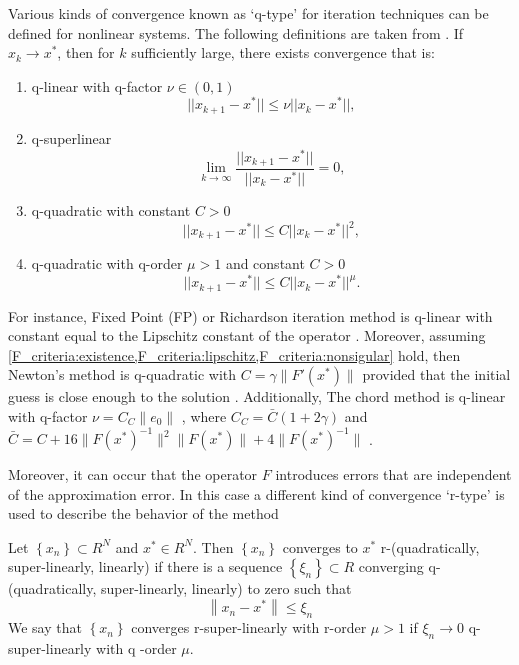 Various kinds of convergence known as `q-type' for iteration techniques can be defined for nonlinear systems. The following definitions are taken from \cite[Section 4.3]{nonlinear_cg_Kelley_1995}. If $x_k \rightarrow x^{*}$, then for $k$ sufficiently large, there exists convergence that is:
\begin{enumerate}[label=\roman*,ref=nonlinear \roman*]
  \item\label{conv_type:qlinear} q-linear with q-factor $\nu \in(0,1)$
  \[
    ||x_{k+1} - x^*|| \leq \nu ||x_k - x^*||,
  \]
  \item\label{conv_type:qsuper_linear} q-superlinear
  \[
    \lim_{k\rightarrow\infty} \frac{||x_{k+1} - x^*||}{||x_k - x^*||} = 0,
  \]
  \item\label{conv_type:qquadratic} q-quadratic with constant $C>0$
  \[
    ||x_{k+1} - x^*|| \leq C ||x_k - x^*||^2,
  \]
  \item\label{conv_type:qsuper_linear_order} q-quadratic with q-order $\mu > 1$ and constant $C>0$
  \[
    ||x_{k+1} - x^*|| \leq C ||x_k - x^*||^{\mu}.
  \]
\end{enumerate}
For instance, Fixed Point (FP) or Richardson iteration method is q-linear with constant equal to the Lipschitz constant of the operator \cite[Theorem 4.2.1]{nonlinear_cg_Kelley_1995}. Moreover, assuming \cref{F_criteria:existence,F_criteria:lipschitz,F_criteria:nonsigular} hold, then Newton's method is q-quadratic with $C = \gamma \|F'(x^*)\|$ provided that the initial guess is close enough to the solution \cite[Theorem 5.1.2]{nonlinear_cg_Kelley_1995}. Additionally, The chord method is q-linear with q-factor $\nu = C_C\|e_0\|$ \cite[Theorem 5.4.2]{nonlinear_cg_Kelley_1995}, where $C_C = \bar{C}(1+2\gamma)$ and $\bar{C} = C + 16 \|F(x^*)^{-1}\|^2\|F(x^*)\| + 4\|F(x^*)^{-1}\|$ \cite[Theorem 5.4.1]{nonlinear_cg_Kelley_1995}.

Moreover, it can occur that the operator $F$ introduces errors that are independent of the approximation error. In this case a different kind of convergence `r-type' is used to describe the behavior of the method \cite[Definition 4.1.3]{nonlinear_cg_Kelley_1995}
\begin{definition}
  Let $\left\{x_n\right\} \subset R^N$ and $x^* \in R^N$. Then $\left\{x_n\right\}$ converges to $x^*$ r-(quadratically, super-linearly, linearly) if there is a sequence $\left\{\xi_n\right\} \subset R$ converging q-(quadratically, super-linearly, linearly) to zero such that
  \[
    \left\|x_n-x^*\right\| \leq \xi_n
  \]
  We say that $\left\{x_n\right\}$ converges r-super-linearly with r-order $\mu>1$ if $\xi_n \rightarrow 0$ q-super-linearly with q -order $\mu$.
\end{definition}

